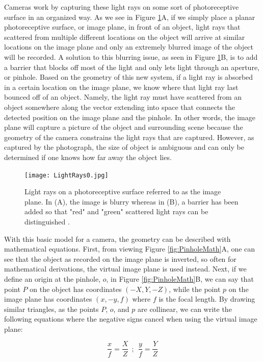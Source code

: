 \begin{itemize}
Cameras work by capturing these light rays on some sort of photoreceptive surface in an organized way. As we see in Figure \ref{fig:LightRays}A, if we simply place a planar photoreceptive surface, or image plane, in front of an object, light rays that scattered from multiple different locations on the object will arrive at similar locations on the image plane and only an extremely blurred image of the object will be recorded. A solution to this blurring issue, as seen in Figure \ref{fig:LightRays}B, is to add a barrier that blocks off most of the light and only lets light through an aperture, or pinhole. Based on the geometry of this new system, if a light ray is absorbed in a certain location on the image plane, we know where that light ray last bounced off of an object. Namely, the light ray must have scattered from an object somewhere along the vector extending into space that connects the detected position on the image plane and the pinhole. In other words, the image plane will capture a picture of the object and surrounding scene because the geometry of the camera constrains the light rays that are captured. However, as captured by the photograph, the size of object is ambiguous and can only be determined if one knows how far away the object lies.

\begin{figure}
\centering
\texttt{[image: LightRays0.jpg]}
\caption{Light rays on a photoreceptive surface referred to as the image plane. In (A), the image is blurry whereas in (B), a barrier has been added so that "red" and "green" scattered light rays can be distinguished  \cite{FP}.}
\label{fig:LightRays}
\end{figure}

With this basic model for a camera, the geometry can be described with mathematical equations. First, from viewing Figure \ref{fig:PinholeMath}A, one can see that the object as recorded on the image plane is inverted, so often for mathematical derivations, the virtual image plane is used instead. Next, if we define an origin at the pinhole, $o$, in Figure \ref{fig:PinholeMath}B, we can say that point $P$ on the object has coordinates $(-X,Y,-Z)$, while the point $p$ on the image plane has coordinates $(x,-y,f)$ where $f$ is the focal length. By drawing similar triangles, as the points $P$, $o$, and $p$ are collinear, we can write the following equations where the negative signs cancel when using the virtual image plane:

$$\frac{x}{f}=\frac{X}{Z} \ \ ; \ \  \frac{y}{f}=\frac{Y}{Z}$$


\end{itemize}
